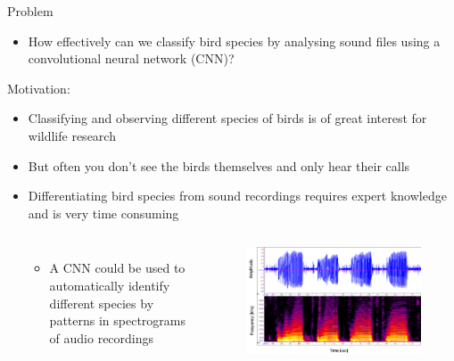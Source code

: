 \begin{frame}{Problem}
  \begin{itemize}
    \item How effectively can we classify bird species by analysing sound files using a convolutional neural network (CNN)?
  \end{itemize}
  \vspace{2mm}
  \textcolor{tugreen}{\Large Motivation:}
  \vspace{1mm}
  \begin{itemize}
    \item Classifying and observing different species of birds is of great interest for wildlife research
    \item But often you don't see the birds themselves and only hear their calls
    \item Differentiating bird species from sound recordings requires expert knowledge and is very time consuming
    \begin{columns}
      \vspace*{-3mm}
      \begin{itemize}
        \item A CNN could be used to automatically identify different species by patterns in spectrograms of audio recordings
      \end{itemize}

      \vspace{-2mm}
      \begin{figure}
        \centering
        \includegraphics[width = .6\textwidth]{content/graphics/spectrogram.png}
        \caption*{\scriptsize {}}
      \end{figure}
    \end{columns}
  \end{itemize}
\end{frame}

